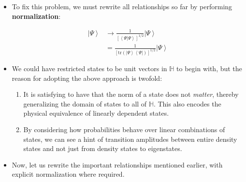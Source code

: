 \documentclass[9pt,handout]{beamer}
\newcommand{\tr}[0]{\text{tr}}
\begin{document}
\begin{frame}{}
\begin{itemize}
\item To fix this problem, we must rewrite all relationships so far by performing \textbf{normalization}:

\begin{align*}
\left\lvert \Psi \right\rangle & \to \frac{1}{\left[ \left\langle \Psi \left\lvert \right. \Psi \right\rangle \right]^{1/2}} \left\lvert \Psi \right\rangle \\
& = \frac{1}{\left[ \tr \left( \left\lvert \Psi \right\rangle \left\langle \Psi \right\rvert \right) \right]^{1/2}} \left\lvert \Psi \right\rangle
\end{align*}

\item We could have restricted states to be unit vectors in $\mathbb{H}$ to begin with, but the reason for adopting the above approach is twofold:

\begin{enumerate}
\item It is satisfying to have that the norm of a state does not \emph{matter}, thereby generalizing the domain of states to all of $\mathbb{H}$. This also encodes the physical equivalence of linearly dependent states.

\item By considering how probabilities behave over linear combinations of states, we can see a hint of transition amplitudes between entire density states and not just from density states to eigenstates.
\end{enumerate}

\item Now, let us rewrite the important relationships mentioned earlier, with explicit normalization where required.
\end{itemize}
\end{frame}
\end{document}
